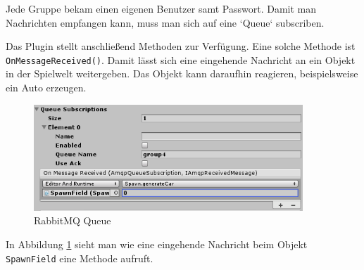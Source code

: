 Jede Gruppe bekam einen eigenen Benutzer samt Passwort. Damit man Nachrichten empfangen kann, muss man sich auf eine `Queue` subscriben.

Das Plugin stellt anschließend Methoden zur Verfügung. Eine solche Methode ist \texttt{OnMessageReceived()}. Damit lässt sich eine eingehende Nachricht an ein Objekt in der Spielwelt weitergeben. Das Objekt kann daraufhin reagieren, beispielsweise ein Auto erzeugen.

\begin{figure}[H]
\begin{center}
	\includegraphics[width=0.9\textwidth]{BilderAllgemein/rabbitqueue.png}
\end{center}

	\caption{RabbitMQ Queue}

	\label{img:rabbitq}
\end{figure}

In Abbildung \ref{img:rabbitq} sieht man wie eine eingehende Nachricht beim Objekt \texttt{SpawnField} eine Methode aufruft.